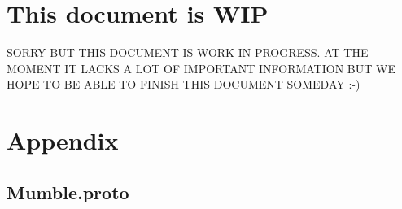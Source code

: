\documentclass[11pt]{article} %
\begin{document}
\section {This document is WIP}
SORRY BUT THIS DOCUMENT IS WORK IN PROGRESS. AT THE MOMENT IT LACKS A LOT OF IMPORTANT INFORMATION BUT WE HOPE TO BE ABLE TO FINISH THIS DOCUMENT SOMEDAY :-)

\appendix
\section{Appendix}
\subsection{Mumble.proto}
\label{appendix:mumble_proto}
\end{document}
